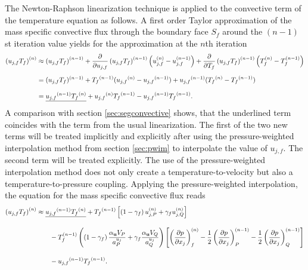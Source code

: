 The Newton-Raphson linearization technique is applied to the convective term of the temperature equation as follows. A first order Taylor approximation of the mass specific convective flux through the boundary face \(S_f\) around the \((n-1)\)st iteration value yields for the approximation at the \(n\)th iteration
\begin{align*}
  \left(u_{j,f} T_f \right)^{(n)} 
  &\approx 
  \left(u_{j,f} T_f \right)^{(n-1)} 
  + \frac{\partial}{\partial u_{j,f}}\left( u_{j,f} T_f \right)^{(n-1)} \left(u_{j,f}^{(n)} - u_{j,f}^{(n-1)} \right) 
  + \frac{\partial}{\partial T_f}\left( u_{j,f} T_f \right)^{(n-1)} \left( T_f^{(n)} - T_f^{(n-1)} \right) \\[0.5em]
  &=
  (u_{j,f} T_f )^{(n-1)} 
  + \vphantom{(u_{j,f} T_f)}{T_f}^{(n-1)} (\vphantom{(u_{j,f} T_f)}{u_{j,f}}^{(n)} - \vphantom{(u_{j,f} T_f)}{u_{j,f}}^{(n-1)} ) 
  +  \vphantom{(u_j T)}{u_{j,f}}^{(n-1)} ( \vphantom{(u_j T)}{T_f}^{(n)} - \vphantom{(u_j T)}{T_f}^{(n-1)} ) \\[0.7em]
  &=
  \underline{\vphantom{(u_j T)}{u_{j,f}}^{(n-1)} \vphantom{(u_{j,f})}{T_f}^{(n)}}  + \vphantom{(u_{j,f} T_f)}{u_{j,f}}^{(n)} \vphantom{(u_jT)}{T_f}^{(n-1)}  -  \vphantom{(u_j T)}{u_{j,f}}^{(n-1)} \vphantom{(u_j T)}{T_f}^{(n-1)}.
\end{align*}
A comparison with section \ref{sec:segconvective} shows, that the underlined term coincides with the term from the usual linearization. The first of the two new terms will be treated implicitly and explicitly after using the pressure-weighted interpolation method from section \ref{sec:pwim} to interpolate the value of \(u_{j,f}\). The second term will be treated explicitly. The use of the pressure-weighted interpolation method does not only create a temperature-to-velocity but also a temperature-to-pressure coupling. Applying the pressure-weighted interpolation, the equation for the mass specific convective flux reads
\begin{align*}
  \left(u_{j,f} T_f \right)^{(n)} 
  &\approx 
  \underline{\vphantom{(u_j T)}{u_{j,f}}^{(n-1)} \vphantom{(u_{j,f})}{T_f}^{(n)}} + \vphantom{(u_jT)}{T_f}^{(n-1)}  \left[\left(1 - \gamma_f\right) u_{j,P}^{(n)} + \gamma_f u_{j,Q}^{(n)} \right] \nonumber\\[1em]
    &\quad\quad 
    - T_f^{(n-1)}\left(\left(1 - \gamma_f\right) \frac{\alpha_\vec{u} V_P}{a_P^{u_j}} + \gamma_f \frac{\alpha_\vec{u} V_Q}{a_Q^{u_j}}\right)
    \left[ 
    \left(\frac{\partial p}{\partial x_j}\right)_f^{(n)} 
    -  \frac{1}{2} \left( \frac{\partial p}{\partial x_j} \right)_P^{(n-1)} 
    - \frac{1}{2} \left(\frac{\partial p}{\partial x_j}\right)_Q^{(n-1)} 
    \right] \nonumber \\[1em]
    &  \quad\quad -\vphantom{(u_j T)}{u_{j,f}}^{(n-1)} \vphantom{(u_j T)}{T_f}^{(n-1)}.
\end{align*}
